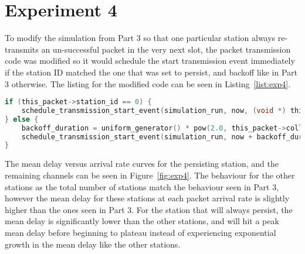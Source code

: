 \section*{Experiment 4}
To modify the simulation from Part 3 so that one particular station always re-transmits an un-successful packet in the very next slot, the packet transmission code was modified so it would schedule the start transmission event immediately if the station ID matched the one that was set to persist, and backoff like in Part 3 otherwise. The listing for the modified code can be seen in Listing~\ref{list:exp4}.

\begin{lstlisting}[language=c,caption=Binary Exponential Backoff with Single Persisting Channel, label=list:exp4]
if (this_packet->station_id == 0) {
	schedule_transmission_start_event(simulation_run, now, (void *) this_packet);
} else {
	backoff_duration = uniform_generator() * pow(2.0, this_packet->collision_count);
	schedule_transmission_start_event(simulation_run, now + backoff_duration, (void *) this_packet);
}
\end{lstlisting}

The mean delay versus arrival rate curves for the persisting station, and the remaining channels can be seen in Figure~\ref{fig:exp4}. The behaviour for the other stations as the total number of stations match the behaviour seen in Part 3, however the mean delay for these stations at each packet arrival rate is slightly higher than the ones seen in Part 3. For the station that will always persist, the mean delay is significantly lower than the other stations, and will hit a peak mean delay before beginning to plateau instead of experiencing exponential growth in the mean delay like the other stations.

